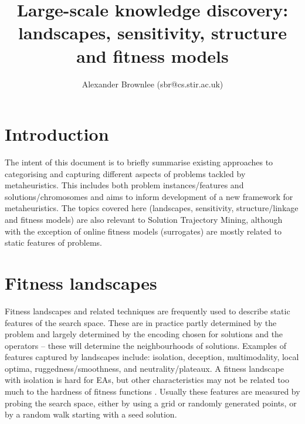 \documentclass[a4paper]{article}
\begin{document}
\title{Large-scale knowledge discovery: landscapes, sensitivity, structure and fitness models}
\author{Alexander Brownlee (sbr@cs.stir.ac.uk)}

\maketitle

\section{Introduction}
The intent of this document is to briefly summarise existing approaches to categorising and capturing different aspects of problems tackled by metaheuristics.
This includes both problem instances/features and solutions/chromosomes and aims to inform development of a new framework for metaheuristics.
The topics covered here (landscapes, sensitivity, structure/linkage and fitness models) are also relevant to Solution Trajectory Mining, although with the exception of online fitness models (surrogates) are mostly related to static features of problems.

\section{Fitness landscapes}

Fitness landscapes and related techniques are frequently used to describe static features of the search space.
These are in practice partly determined by the problem and largely determined by the encoding chosen for solutions and the operators -- these will determine the neighbourhoods of solutions.
Examples of features captured by landscapes include: isolation, deception, multimodality, local optima, ruggedness/smoothness, and neutrality/plateaux.
A fitness landscape with isolation is hard for EAs, but other characteristics may not be related too much to the hardness of fitness functions \cite{Naudts2000}.
Usually these features are measured by probing the search space, either by using a grid or randomly generated points, or by a random walk starting with a seed solution.
\end{document}
